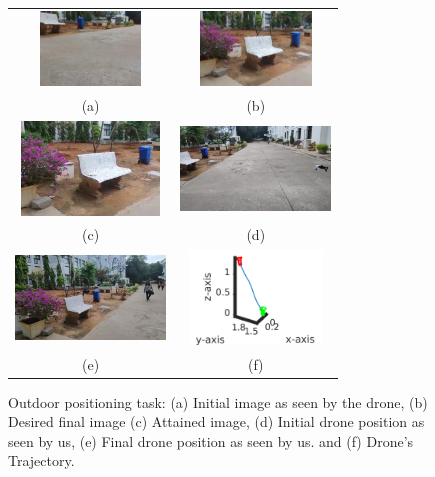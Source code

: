 \documentclass[letterpaper, 10 pt, conference]{ieeeconf}  %
\begin{document}
\begin{figure}%
\centering
\begin{tabular}{cc}
\includegraphics[width=4cm,height=2cm]{drone/intitial.png} &
\includegraphics[width=4cm,height=2cm]{drone/desired_image.png} \\
(a) & (b) \\
\includegraphics[width=4cm, height=2.5cm]{drone/attained_image.png} &
\includegraphics[width=4cm, height=2.5cm]{drone/drone_initial.png} \\
(c) & (d) \\
\includegraphics[width=4cm, height=2.5cm]{drone/drone_final.png} &
\includegraphics[width=4cm, height=2.5cm]{drone/Drone_traj_small2.pdf} \\
(e) & (f)
\end{tabular}
\caption{Outdoor positioning task: (a) Initial image as seen by the drone, (b) Desired final image (c) Attained image,
(d) Initial drone position as seen by us,
(e) Final drone position as seen by us. and (f) Drone's Trajectory.}

\label{fig:ex3}%
\end{figure}
\end{document}
